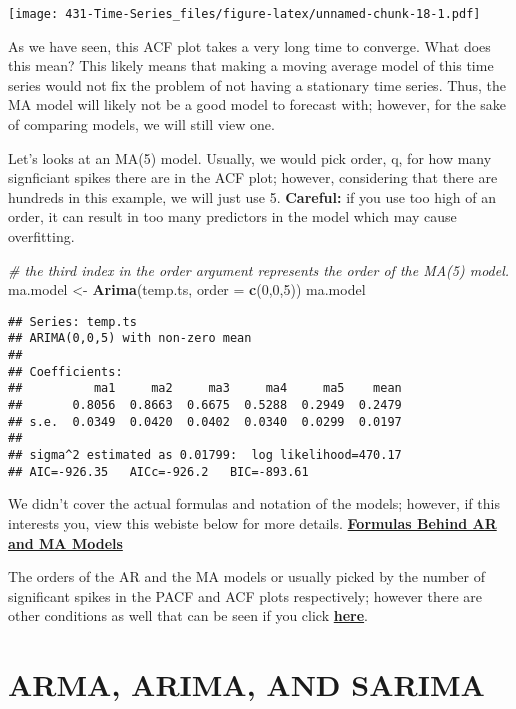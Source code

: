 \documentclass[
]{book}
\newenvironment{Shaded}{\begin{snugshade}}{\end{snugshade}}
\newcommand{\CommentTok}[1]{\textcolor[rgb]{0.56,0.35,0.01}{\textit{#1}}}
\newcommand{\DataTypeTok}[1]{\textcolor[rgb]{0.13,0.29,0.53}{#1}}
\newcommand{\DecValTok}[1]{\textcolor[rgb]{0.00,0.00,0.81}{#1}}
\newcommand{\KeywordTok}[1]{\textcolor[rgb]{0.13,0.29,0.53}{\textbf{#1}}}
\newcommand{\NormalTok}[1]{#1}
\newcommand{\StringTok}[1]{\textcolor[rgb]{0.31,0.60,0.02}{#1}}
\begin{document}
\texttt{[image: 431-Time-Series\_files/figure-latex/unnamed-chunk-18-1.pdf]}

As we have seen, this ACF plot takes a very long time to converge. What does this mean? This likely means that making a moving average model of this time series would not fix the problem of not having a stationary time series. Thus, the MA model will likely not be a good model to forecast with; however, for the sake of comparing models, we will still view one.

Let's looks at an MA(5) model. Usually, we would pick order, q, for how many signficiant spikes there are in the ACF plot; however, considering that there are hundreds in this example, we will just use 5. \textbf{Careful:} if you use too high of an order, it can result in too many predictors in the model which may cause overfitting.

\begin{Shaded}
\begin{Highlighting}[]
\CommentTok{# the third index in the order argument represents the order of the MA(5) model.}
\NormalTok{ma.model <-}\StringTok{ }\KeywordTok{Arima}\NormalTok{(temp.ts, }\DataTypeTok{order =} \KeywordTok{c}\NormalTok{(}\DecValTok{0}\NormalTok{,}\DecValTok{0}\NormalTok{,}\DecValTok{5}\NormalTok{))}
\NormalTok{ma.model}
\end{Highlighting}
\end{Shaded}

\begin{verbatim}
## Series: temp.ts 
## ARIMA(0,0,5) with non-zero mean 
## 
## Coefficients:
##          ma1     ma2     ma3     ma4     ma5    mean
##       0.8056  0.8663  0.6675  0.5288  0.2949  0.2479
## s.e.  0.0349  0.0420  0.0402  0.0340  0.0299  0.0197
## 
## sigma^2 estimated as 0.01799:  log likelihood=470.17
## AIC=-926.35   AICc=-926.2   BIC=-893.61
\end{verbatim}

We didn't cover the actual formulas and notation of the models; however, if this interests you, view this webiste below for more details.
\href{https://maryclare.github.io/atsa/content/notes/notes_3.pdf}{\textbf{Formulas Behind AR and MA Models}}

The orders of the AR and the MA models or usually picked by the number of significant spikes in the PACF and ACF plots respectively; however there are other conditions as well that can be seen if you click \href{https://people.duke.edu/~rnau/arimrule.htm}{\textbf{here}}.

\hypertarget{arma-arima-and-sarima}{%
\section{ARMA, ARIMA, AND SARIMA}\label{arma-arima-and-sarima}}
\end{document}
